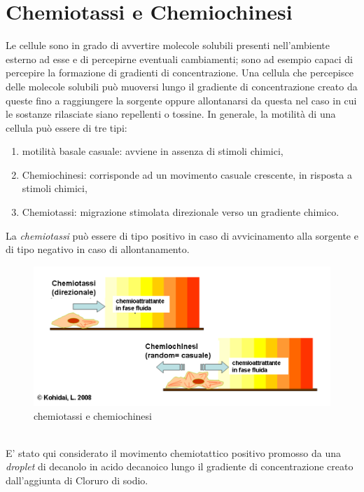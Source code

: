 \section{Chemiotassi e Chemiochinesi}
\label{sec:456}
Le cellule sono in grado di avvertire molecole solubili presenti nell'ambiente esterno ad esse e di percepirne eventuali cambiamenti; sono ad esempio capaci di percepire la formazione di gradienti di concentrazione. 
Una cellula che percepisce delle molecole solubili può muoversi lungo il gradiente di concentrazione creato da queste fino a raggiungere la sorgente oppure allontanarsi da questa nel caso in cui le sostanze rilasciate siano repellenti o tossine.
In generale, la motilità di una cellula può essere di tre tipi:
\begin{enumerate}
\item motilità basale casuale: avviene in assenza di stimoli chimici,
\item Chemiochinesi: corrisponde ad un movimento casuale crescente, in risposta a stimoli chimici,
\item Chemiotassi: migrazione stimolata direzionale verso un gradiente chimico.
\end{enumerate}
La \emph{chemiotassi} può essere di tipo positivo in caso di avvicinamento alla sorgente e di tipo negativo in caso di allontanamento.
	\begin{figure}[h]
	  \includegraphics[scale=0.50]{immagini/chemochin.png}
		\centering	
	 \caption{chemiotassi e chemiochinesi}
	\end{figure}
\pagebreak
\\E' stato qui considerato il movimento chemiotattico positivo promosso da una \emph{droplet} di decanolo in acido decanoico lungo il gradiente di concentrazione creato dall'aggiunta di Cloruro di sodio.
